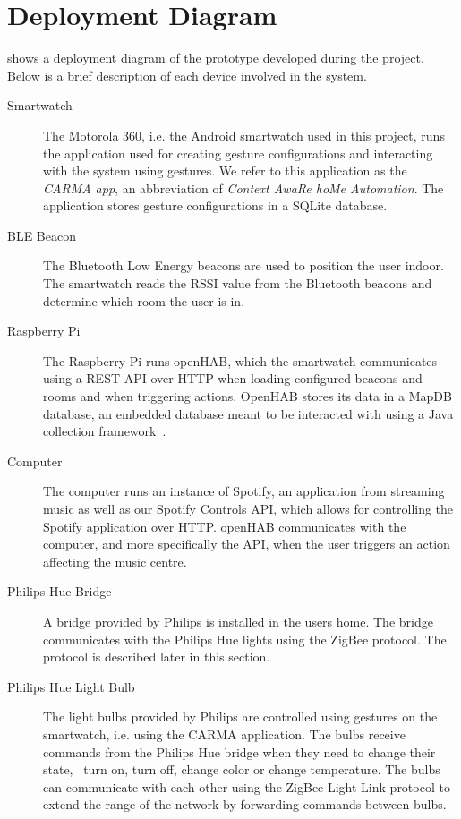 \section{Deployment Diagram}

 shows a deployment diagram of the prototype developed during the project. Below is a brief description of each device involved in the system.

\begin{description}
\item[Smartwatch] The Motorola 360, i.e. the Android smartwatch used in this project, runs the application used for creating gesture configurations and interacting with the system using gestures. We refer to this application as the \emph{CARMA app}, an abbreviation of \emph{Context AwaRe hoMe Automation}. The application stores gesture configurations in a SQLite database.
\item[BLE Beacon] The Bluetooth Low Energy beacons are used to position the user indoor. The smartwatch reads the RSSI value from the Bluetooth beacons and determine which room the user is in.
\item[Raspberry Pi] The Raspberry Pi runs openHAB, which the smartwatch communicates using a REST API over HTTP when loading configured beacons and rooms and when triggering actions. OpenHAB stores its data in a MapDB database, an embedded database meant to be interacted with using a Java collection framework~\cite{mapdb:mapdb}.
\item[Computer] The computer runs an instance of Spotify, an application from streaming music as well as our Spotify Controls API, which allows for controlling the Spotify application over HTTP. openHAB communicates with the computer, and more specifically the API, when the user triggers an action affecting the music centre.
\item[Philips Hue Bridge] A bridge provided by Philips is installed in the users home. The bridge communicates with the Philips Hue lights using the ZigBee protocol. The protocol is described later in this section.
\item[Philips Hue Light Bulb] The light bulbs provided by Philips are controlled using gestures on the smartwatch, i.e. using the CARMA application. The bulbs receive commands from the Philips Hue bridge when they need to change their state, \eg~turn on, turn off, change color or change temperature. The bulbs can communicate with each other using the ZigBee Light Link protocol to extend the range of the network by forwarding commands between bulbs.
\end{description}

